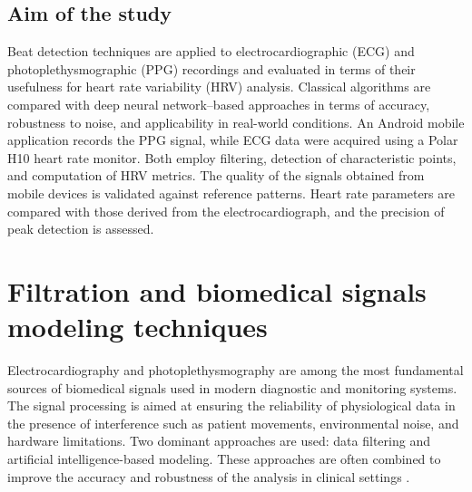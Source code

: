 \documentclass{citask}
\begin{document}
\subsection{Aim of the study}
Beat detection techniques are applied to electrocardiographic (ECG) and photoplethysmographic (PPG) recordings and evaluated in terms of their usefulness for heart rate variability (HRV) analysis. Classical algorithms are compared with deep neural network–based approaches in terms of accuracy, robustness to noise, and applicability in real-world conditions. An Android mobile application records the PPG signal, while ECG data were acquired using a Polar H10 heart rate monitor. Both employ filtering, detection of characteristic points, and computation of HRV metrics. The quality of the signals obtained from mobile devices is validated against reference patterns. Heart rate parameters are compared with those derived from the electrocardiograph, and the precision of peak detection is assessed.

\section{Filtration and biomedical signals modeling techniques}
Electrocardiography and photoplethysmography are among the most fundamental sources of biomedical signals used in modern diagnostic and monitoring systems. The signal processing is aimed at ensuring the reliability of physiological data in the presence of interference such as patient movements, environmental noise, and hardware limitations. Two dominant approaches are used: data filtering and artificial intelligence-based modeling. These approaches are often combined to improve the accuracy and robustness of the analysis in clinical settings \cite{1}.
\end{document}
